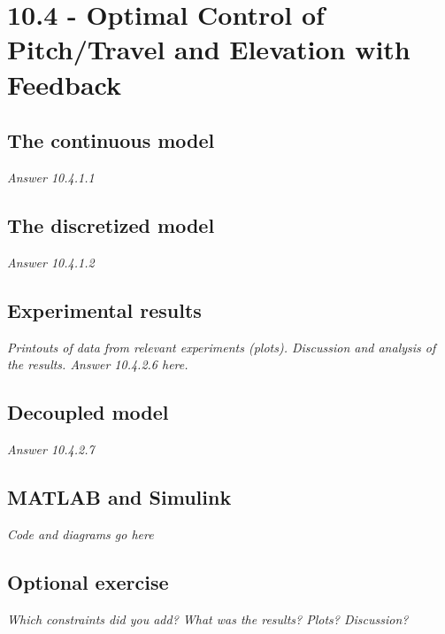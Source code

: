 \documentclass[../main.tex]{subfiles}
\begin{document}
\section{10.4 - Optimal Control of Pitch/Travel and Elevation with Feedback}

\subsection{The continuous model}
\textit{Answer 10.4.1.1}

\subsection{The discretized model}
\textit{Answer 10.4.1.2}

\subsection{Experimental results}
\textit{Printouts of data from relevant experiments (plots).
Discussion and analysis of the results.
Answer 10.4.2.6 here.}

\subsection{Decoupled model}
\textit{Answer 10.4.2.7}

\subsection{MATLAB and Simulink}
\textit{Code and diagrams go here}

\subsection{Optional exercise}
\textit{Which constraints did you add? What was the results? Plots? Discussion?}
\end{document}
